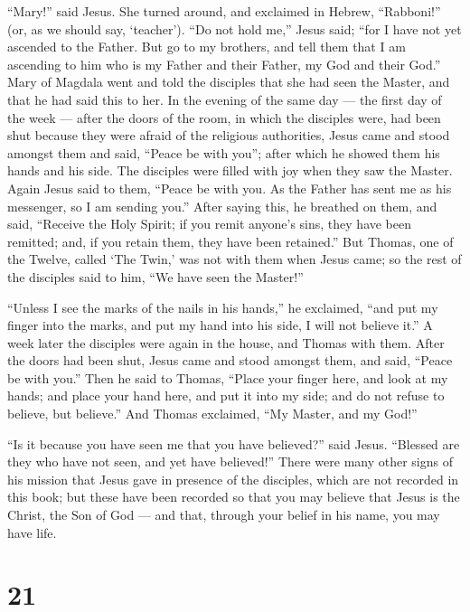  ``Mary!'' said Jesus. She turned around, and exclaimed in
Hebrew, ``Rabboni!'' (or, as we should say, `teacher'). 
``Do not hold me,'' Jesus said; ``for I have not yet ascended to the
Father. But go to my brothers, and tell them that I am ascending to him
who is my Father and their Father, my God and their God.'' 
Mary of Magdala went and told the disciples that she had seen the
Master, and that he had said this to her.  In the evening
of the same day --- the first day of the week --- after the doors of the
room, in which the disciples were, had been shut because they were
afraid of the religious authorities, Jesus came and stood amongst them
and said, ``Peace be with you'';  after which he showed
them his hands and his side. The disciples were filled with joy when
they saw the Master.  Again Jesus said to them, ``Peace be
with you. As the Father has sent me as his messenger, so I am sending
you.''  After saying this, he breathed on them, and said,
``Receive the Holy Spirit;  if you remit anyone's sins,
they have been remitted; and, if you retain them, they have been
retained.''  But Thomas, one of the Twelve, called `The
Twin,' was not with them when Jesus came;  so the rest of
the disciples said to him, ``We have seen the Master!''

``Unless I see the marks of the nails in his hands,'' he exclaimed,
``and put my finger into the marks, and put my hand into his side, I
will not believe it.''  A week later the disciples were
again in the house, and Thomas with them. After the doors had been shut,
Jesus came and stood amongst them, and said, ``Peace be with you.''
 Then he said to Thomas, ``Place your finger here, and look
at my hands; and place your hand here, and put it into my side; and do
not refuse to believe, but believe.''  And Thomas
exclaimed, ``My Master, and my God!''

 ``Is it because you have seen me that you have believed?''
said Jesus. ``Blessed are they who have not seen, and yet have
believed!''  There were many other signs of his mission
that Jesus gave in presence of the disciples, which are not recorded in
this book;  but these have been recorded so that you may
believe that Jesus is the Christ, the Son of God --- and that, through
your belief in his name, you may have life.

\hypertarget{section-20}{%
\section{21}\label{section-20}}

